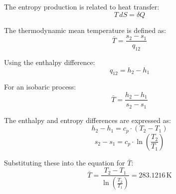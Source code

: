 The entropy production is related to heat transfer:  
\[
T \, dS = \delta Q
\]  

The thermodynamic mean temperature is defined as:  
\[
\bar{T} = \frac{s_2 - s_1}{q_{12}}
\]  

Using the enthalpy difference:  
\[
q_{12} = h_2 - h_1
\]  

For an isobaric process:  
\[
\bar{T} = \frac{h_2 - h_1}{s_2 - s_1}
\]  

The enthalpy and entropy differences are expressed as:  
\[
h_2 - h_1 = c_p \cdot (T_2 - T_1)
\]  
\[
s_2 - s_1 = c_p \cdot \ln\left(\frac{T_2}{T_1}\right)
\]  

Substituting these into the equation for \(\bar{T}\):  
\[
\bar{T} = \frac{T_2 - T_1}{\ln\left(\frac{T_2}{T_1}\right)} = 283.1216 \, \text{K}
\]